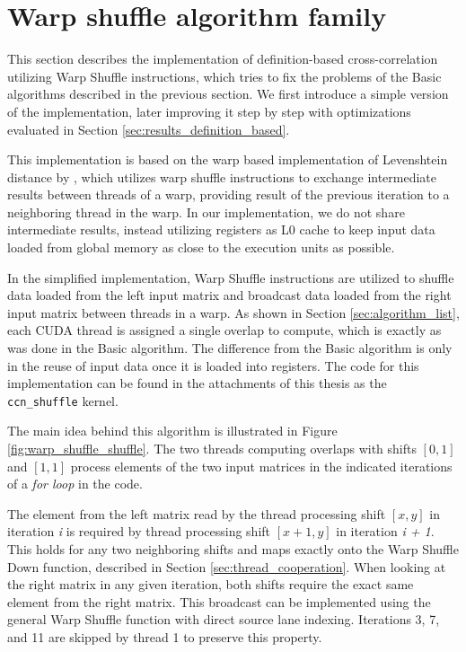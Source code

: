 \section{Warp shuffle algorithm family}
\label{sec:warp_shuffle_alg}

This section describes the implementation of definition-based cross-correlation utilizing Warp Shuffle instructions, which tries to fix the problems of the Basic algorithms described in the previous section. We first introduce a simple version of the implementation, later improving it step by step with optimizations evaluated in Section \ref{sec:results_definition_based}.

This implementation is based on the warp based implementation of Levenshtein distance by \citep{paper:levenstein}, which utilizes warp shuffle instructions to exchange intermediate results between threads of a warp, providing result of the previous iteration to a neighboring thread in the warp. In our implementation, we do not share intermediate results, instead utilizing registers as L0 cache to keep input data loaded from global memory as close to the execution units as possible. 


In the simplified implementation, Warp Shuffle instructions are utilized to shuffle data loaded from the left input matrix and broadcast data loaded from the right input matrix between threads in a warp. As shown in Section \ref{sec:algorithm_list}, each CUDA thread is assigned a single overlap to compute, which is exactly as was done in the Basic algorithm. The difference from the Basic algorithm is only in the reuse of input data once it is loaded into registers. The code for this implementation can be found in the attachments of this thesis as the \texttt{ccn\_shuffle} kernel.

The main idea behind this algorithm is illustrated in Figure \ref{fig:warp_shuffle_shuffle}. The two threads computing overlaps with shifts $[0,1]$ and $[1,1]$ process elements of the two input matrices in the indicated iterations of a \textit{for loop} in the code.


The element from the left matrix read by the thread processing shift $[x, y]$ in iteration \textit{i} is required by thread processing shift $[x + 1,y]$ in iteration \textit{i + 1}. This holds for any two neighboring shifts and maps exactly onto the Warp Shuffle Down function, described in Section \ref{sec:thread_cooperation}. When looking at the right matrix in any given iteration, both shifts require the exact same element from the right matrix. This broadcast can be implemented using the general Warp Shuffle function with direct source lane indexing. Iterations 3, 7, and 11 are skipped by thread 1 to preserve this property.

